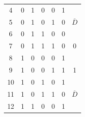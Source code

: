 \begin{center}
\begin{minipage}[t]{0.45\textwidth}
\begin{tabular}{ccccccc}
\multicolumn{1}{c|}{4}                           & 0                         & 1                         & 0                         & \multicolumn{1}{c|}{0}                         & \multicolumn{1}{c|}{1}                             &                                  \\
\multicolumn{1}{c|}{5}                           & 0                         & 1                         & 0                         & \multicolumn{1}{c|}{1}                         & \multicolumn{1}{c|}{0}                             & \multirow{-2}{*}{$\overline{D}$} \\ \hline
\multicolumn{1}{c|}{6}                           & 0                         & 1                         & 1                         & \multicolumn{1}{c|}{0}                         & \multicolumn{1}{c|}{0}                             &                                  \\
\multicolumn{1}{c|}{7}                           & 0                         & 1                         & 1                         & \multicolumn{1}{c|}{1}                         & \multicolumn{1}{c|}{0}                             & \multirow{-2}{*}{0}              \\ \hline
\multicolumn{1}{c|}{8}                           & 1                         & 0                         & 0                         & \multicolumn{1}{c|}{0}                         & \multicolumn{1}{c|}{1}                             &                                  \\
\multicolumn{1}{c|}{9}                           & 1                         & 0                         & 0                         & \multicolumn{1}{c|}{1}                         & \multicolumn{1}{c|}{1}                             & \multirow{-2}{*}{1}              \\ \hline
\multicolumn{1}{c|}{10}                          & 1                         & 0                         & 1                         & \multicolumn{1}{c|}{0}                         & \multicolumn{1}{c|}{1}                             &                                  \\
\multicolumn{1}{c|}{11}                          & 1                         & 0                         & 1                         & \multicolumn{1}{c|}{1}                         & \multicolumn{1}{c|}{0}                             & \multirow{-2}{*}{$\overline{D}$} \\ \hline
\multicolumn{1}{c|}{12}                          & 1                         & 1                         & 0                         & \multicolumn{1}{c|}{0}                         & \multicolumn{1}{c|}{1}                             &                                  \\

\end{tabular}
\end{minipage}
\end{center}
